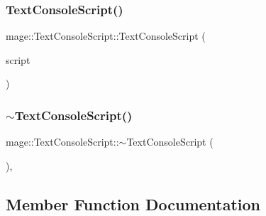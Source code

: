 \hypertarget{classmage_1_1_text_console_script_a6d245efb103011f1b2e2c43c590c22bf}{}\label{classmage_1_1_text_console_script_a6d245efb103011f1b2e2c43c590c22bf} 
\subsubsection{\texorpdfstring{Text\+Console\+Script()}{TextConsoleScript()}\hspace{0.1cm}{\footnotesize\ttfamily [3/3]}}
{\footnotesize\ttfamily mage\+::\+Text\+Console\+Script\+::\+Text\+Console\+Script (\begin{DoxyParamCaption}\item[{\hyperlink{classmage_1_1_text_console_script}{Text\+Console\+Script} \&\&}]{script }\end{DoxyParamCaption})\hspace{0.3cm}{\ttfamily [default]}}

\hypertarget{classmage_1_1_text_console_script_a3269d6b792053d4ce13d63103ca5b4e9}{}\label{classmage_1_1_text_console_script_a3269d6b792053d4ce13d63103ca5b4e9} 
\subsubsection{\texorpdfstring{$\sim$\+Text\+Console\+Script()}{~TextConsoleScript()}}
{\footnotesize\ttfamily mage\+::\+Text\+Console\+Script\+::$\sim$\+Text\+Console\+Script (\begin{DoxyParamCaption}{ }\end{DoxyParamCaption})\hspace{0.3cm}{\ttfamily [virtual]}, {\ttfamily [default]}}



\subsection{Member Function Documentation}
\hypertarget{classmage_1_1_text_console_script_aff5acec462f505735720a17d541ba912}{}\label{classmage_1_1_text_console_script_aff5acec462f505735720a17d541ba912} 
